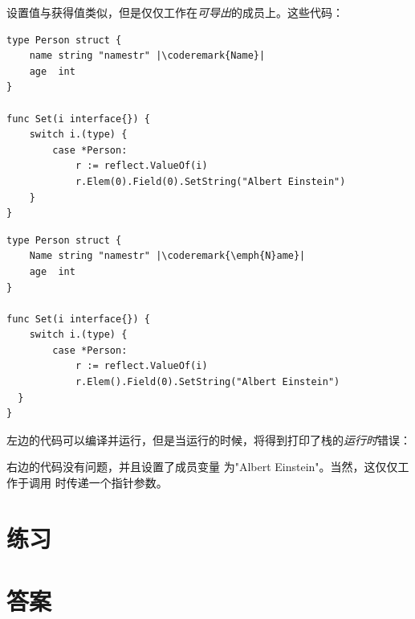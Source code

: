 设置值与获得值类似，但是仅仅工作在\emph{可导出}的成员上。这些代码：

\begin{minipage}{.5\textwidth}
\begin{lstlisting}[caption=私有成员的反射]
type Person struct {
    name string "namestr" |\coderemark{Name}|
    age  int
}

func Set(i interface{}) {
    switch i.(type) {
        case *Person:
            r := reflect.ValueOf(i)
            r.Elem(0).Field(0).SetString("Albert Einstein")
    }
}
\end{lstlisting}
\end{minipage}
\hspace{2em}
\begin{minipage}{.5\textwidth}
\begin{lstlisting}[caption=公有成员的反射]
type Person struct {
    Name string "namestr" |\coderemark{\emph{N}ame}|
    age  int
}

func Set(i interface{}) {
    switch i.(type) {
        case *Person:
            r := reflect.ValueOf(i)
            r.Elem().Field(0).SetString("Albert Einstein")
  }
}
\end{lstlisting}
\end{minipage}
左边的代码可以编译并运行，但是当运行的时候，将得到打印了栈的\emph{运行时}错误：

\noindent{}

\noindent{}右边的代码没有问题，并且设置了成员变量  
为"Albert Einstein"。当然，这仅仅工作于调用  时传递一个指针参数。

\section{练习}






\cleardoublepage
\section{答案}
\shipoutAnswer
